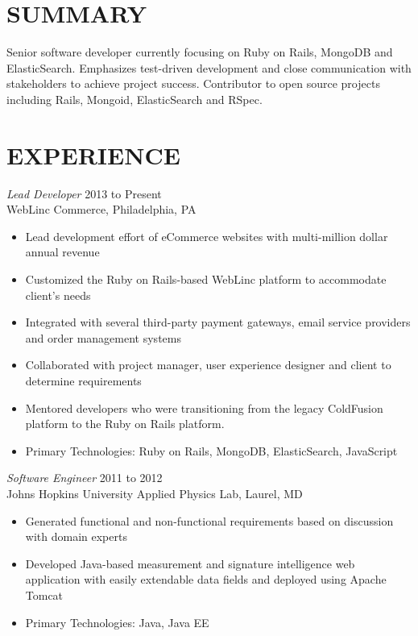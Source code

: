 \documentclass[line,margin]{res}
\begin{document}
\newsectionwidth{1.5in}

\address{26 Park Ave, Apt E67, Chalfont, PA 18914}
\address{(267) 247-2541 / michaelcdalton@gmail.com / github.com/kcdragon}

\begin{resume}

\section{SUMMARY}
Senior software developer currently focusing on Ruby on Rails, MongoDB and ElasticSearch. Emphasizes test-driven development and close communication with stakeholders to achieve project success. Contributor to open source projects including Rails, Mongoid, ElasticSearch and RSpec.

\section{EXPERIENCE}

{\sl Lead Developer} \hfill 2013 to Present \\
WebLinc Commerce, Philadelphia, PA
\begin{itemize} \itemsep -2pt %
\item Lead development effort of eCommerce websites with multi-million dollar annual revenue
\item Customized the Ruby on Rails-based WebLinc platform to accommodate client's needs
\item Integrated with several third-party payment gateways, email service providers and order management systems
\item Collaborated with project manager, user experience designer and client to determine requirements
\item Mentored developers who were transitioning from the legacy ColdFusion platform to the Ruby on Rails platform.
\item Primary Technologies: Ruby on Rails, MongoDB, ElasticSearch, JavaScript
\end{itemize}

{\sl Software Engineer} \hfill 2011 to 2012 \\
Johns Hopkins University Applied Physics Lab, Laurel, MD
\begin{itemize}  \itemsep -2pt %
\item Generated functional and non-functional requirements based on discussion with domain experts
\item Developed Java-based measurement and signature intelligence web application with easily extendable data fields and deployed using Apache Tomcat
\item Primary Technologies: Java, Java EE
\end{itemize}


\end{resume}
\end{document}
